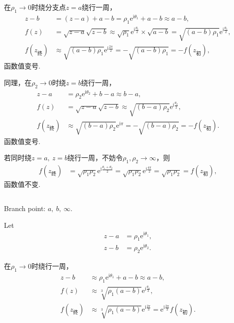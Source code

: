 \documentclass[12pt]{article}
\newcommand{\mrm}[1]{\mathrm{#1}}
\begin{document}
在$\rho_1\to0$时绕分支点$z=a$绕行一周，
\begin{align*}
z-b &= (z-a) + a-b = \rho_1 \mrm e^{\mathrm{i}\theta_1} + a-b \approx a-b, \\
f(z) &= \sqrt{z-a}\sqrt{z-b} \approx \sqrt{\rho_1} \mrm e^{\mathrm{i}\frac{\theta_1}{2}} \times \sqrt{a-b} = \sqrt{(a-b)\rho_1} \mrm e^{\mathrm{i}\frac{\theta_1}{2}}, \\
f(z_{\text{终}}) &\approx \sqrt{(a-b)\rho_1} \mrm e^{\mathrm{i}\frac{2\pi}{2}} = -\sqrt{(a-b)\rho_1} = -f(z_{\text{初}}),
\end{align*}
函数值变号.

同理，在$\rho_2\to0$时绕$z=b$绕行一周，
\begin{align*}
z-a &= \rho_2 \mrm e^{\mathrm{i}\theta_2} + b-a \approx b-a, \\
f(z) &= \sqrt{z-a}\sqrt{z-b} \approx \sqrt{(b-a)\rho_2} \mrm e^{\mathrm{i}\frac{\theta_2}{2}}, \\
f(z_{\text{终}}) &\approx \sqrt{(b-a)\rho_2} \mrm e^{\mathrm{i}\pi} = -\sqrt{(b-a)\rho_2} = -f(z_{\text{初}}).
\end{align*}
函数值变号.

若同时绕$z=a,\ z=b$绕行一周，不妨令$\rho_1,\rho_2\to\infty$，则
\begin{align*}
f(z_{\text{终}}) &= \sqrt{\rho_1\rho_2} \mrm e^{\mathrm{i}\frac{\theta_1+\theta_2}{2}} = \sqrt{\rho_1\rho_2} \mrm e^{\mathrm{i}\frac{4\pi}{2}} = \sqrt{\rho_1\rho_2} = f(z_{\text{初}}),
\end{align*}
函数值不变.
\subsection{}
Branch point: $a,\ b,\ \infty$.

Let
\begin{align*}
z-a &= \rho_1 \mrm e^{\mathrm{i}\theta_1}, \\ z-b &= \rho_2 \mrm e^{\mathrm{i}\theta_2}.
\end{align*}

在$\rho_1\to0$时绕行一周，
\begin{align*}
z-b &\approx \rho_1 \mrm e^{\mathrm{i}\theta_1} + a-b \approx a-b, \\
f(z) &\approx \sqrt[3]{\rho_1(a-b)} \mrm e^{\mathrm{i}\frac{\theta_1}{3}}, \\
f(z_{\text{终}}) &\approx \sqrt[3]{\rho_1(a-b)} \mrm e^{\mathrm{i}\frac{2\pi}{3}} = \mrm e^{\mathrm{i}\frac{2\pi}{3}} f(z_{\text{初}}).
\end{align*}
\end{document}
